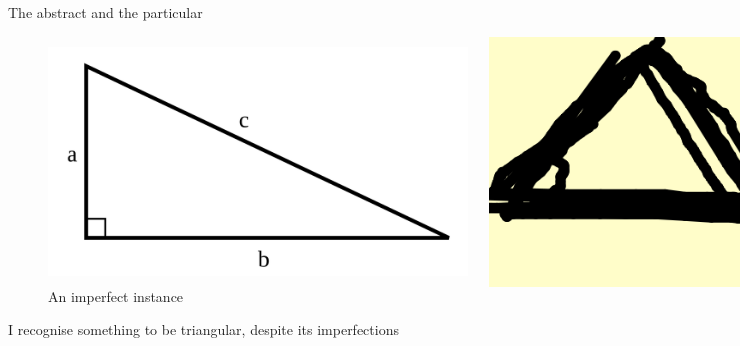 \documentclass[xcolor=dvipsnames]{beamer}
\begin{document}
\begin{frame}{The abstract and the particular}
\begin{figure}
  \centering
  \begin{columns}
    \centering
    \caption {\emph{That which is triangular}}
    \includegraphics[width=0.99\textwidth]{triangular}
    \centering
    \caption {An imperfect instance}
    \includegraphics[width=0.99\textwidth]{triangle}
  \end{columns}
\end{figure}
I recognise something to be triangular, despite its imperfections
\end{frame}
\end{document}
